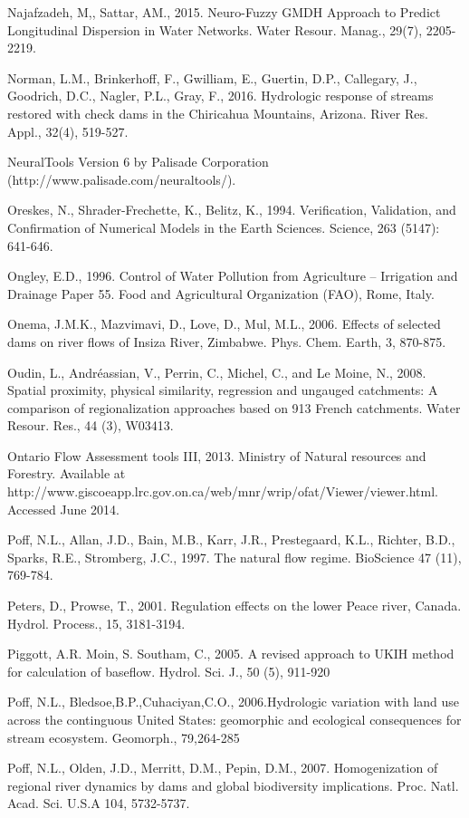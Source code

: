 \begin{hangingpar}{2em}
Najafzadeh, M,, Sattar, AM., 2015. Neuro-Fuzzy GMDH Approach to Predict Longitudinal Dispersion in Water Networks. Water Resour. Manag., 29(7),  2205-2219.

Norman, L.M., Brinkerhoff, F., Gwilliam, E., Guertin, D.P., Callegary, J., Goodrich, D.C., Nagler, P.L., Gray, F., 2016. Hydrologic response of streams restored with check dams in the Chiricahua Mountains, Arizona. River Res. Appl., 32(4), 519-527.

NeuralTools Version 6 by Palisade Corporation (http://www.palisade.com/neuraltools/).

Oreskes, N., Shrader-Frechette, K., Belitz, K., 1994.  Verification, Validation, and Confirmation of Numerical Models in the Earth Sciences. Science, 263 (5147): 641-646.

Ongley, E.D., 1996. Control of Water Pollution from Agriculture – Irrigation and Drainage Paper 55. Food and Agricultural Organization (FAO), Rome, Italy. 

Onema, J.M.K., Mazvimavi, D., Love, D., Mul, M.L., 2006.  Effects of selected dams on river flows of Insiza River, Zimbabwe. Phys. Chem. Earth, 3, 870-875.

Oudin, L., Andréassian, V., Perrin, C., Michel, C., and Le Moine, N., 2008. Spatial proximity, physical similarity, regression and ungauged catchments: A comparison of regionalization approaches based on 913 French catchments. Water Resour. Res., 44 (3), W03413. 

Ontario Flow Assessment tools III, 2013. Ministry of Natural resources and Forestry. Available at \\http://www.giscoeapp.lrc.gov.on.ca/web/mnr/wrip/ofat/Viewer/viewer.html. Accessed June 2014.

Poff, N.L., Allan, J.D., Bain, M.B., Karr, J.R., Prestegaard, K.L., Richter, B.D., Sparks, R.E., Stromberg, J.C., 1997. The natural flow regime. BioScience 47 (11), 769-784.

Peters, D., Prowse, T., 2001. Regulation effects on the lower Peace river, Canada. Hydrol. Process., 15, 3181-3194.

Piggott, A.R. Moin, S. Southam, C., 2005. A revised approach to UKIH method for calculation of baseflow. Hydrol. Sci. J., 50 (5), 911-920

Poff, N.L., Bledsoe,B.P.,Cuhaciyan,C.O., 2006.Hydrologic variation with land use across the continguous United States: geomorphic and ecological consequences for stream ecosystem. Geomorph., 79,264-285

Poff, N.L., Olden, J.D., Merritt, D.M., Pepin, D.M., 2007. Homogenization of regional river dynamics by dams and global biodiversity implications. Proc. Natl. Acad. Sci. U.S.A 104, 5732-5737.


\end{hangingpar}
